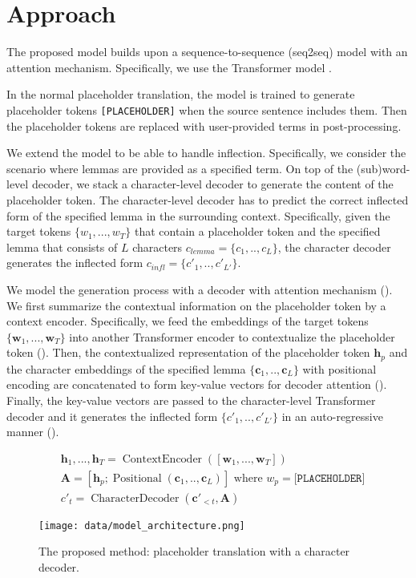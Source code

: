 \section{Approach}
\label{sec:approach}
The proposed model builds upon a sequence-to-sequence (seq2seq) model with an attention mechanism.
Specifically, we use the Transformer model \citep{NIPS2017_3f5ee243}.

In the normal placeholder translation, the model is trained to generate placeholder tokens \texttt{[PLACEHOLDER]} when the source sentence includes them.
Then the placeholder tokens are replaced with user-provided terms in post-processing.

We extend the model to be able to handle inflection. Specifically, we consider the scenario where lemmas are provided as a specified term.
On top of the (sub)word-level decoder, we stack a character-level decoder to generate the content of the placeholder token.
The character-level decoder has to predict the correct inflected form of the specified lemma in the surrounding context.
Specifically, given the target tokens $\{w_1,..., w_T\}$ that contain a placeholder token and the specified lemma that consists of $L$ characters $c_{lemma} = \{c_1, .., c_L\}$, the character decoder generates the inflected form $c_{infl} = \{c'_1, .., c'_{L'}\}$.

We model the generation process with a decoder with attention mechanism ().
We first summarize the contextual information on the placeholder token by a context encoder.
Specifically, we feed the embeddings of the target tokens $\{\bm{w}_1,..., \bm{w}_T\}$ into another Transformer encoder to contextualize the placeholder token ().
Then, the contextualized  representation of the placeholder token $\bm{h}_p$ and the character embeddings of the specified lemma $\{\bm{c}_1, .., \bm{c}_L\}$ with positional encoding \citep{NIPS2017_3f5ee243} are concatenated to form key-value vectors for decoder attention ().
Finally, the key-value vectors are passed to the character-level Transformer decoder and it generates the inflected form $\{c'_1, .., c'_{L'}\}$ in an auto-regressive manner ().

\begin{align}
  & \bm{h}_{1},..., \bm{h}_{T} = \operatorname{ContextEncoder}([\bm{w}_1,..., \bm{w}_T]) \label{eq1} \\
  & \bm{A} = [\bm{h}_p; \operatorname{Positional}(\bm{c}_1, .., \bm{c}_L)] \text{  where  } w_p = \texttt{[PLACEHOLDER]} \label{eq2} \\
  & c'_{t} = \operatorname{CharacterDecoder}(\bm{c'}_{<t}, \bm{A}) \label{eq3}
\end{align}


\begin{figure}[t]
\centering
\texttt{[image: data/model\_architecture.png]}
\caption{The proposed method: placeholder translation with a character decoder.}
\label{fig:architecture}
\end{figure}
